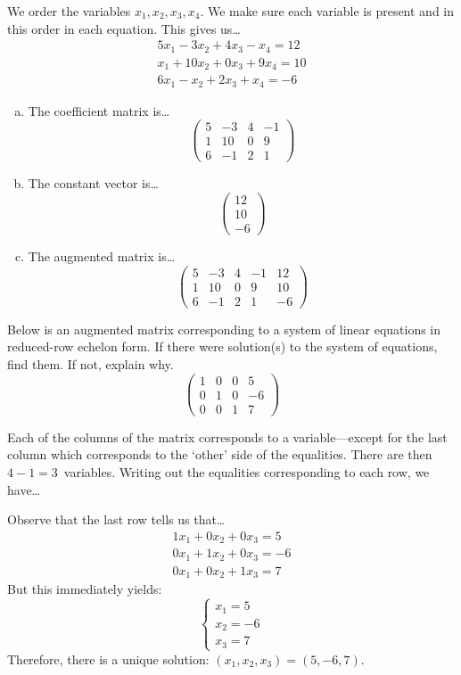 \documentclass[12pt,letterpaper]{exam}
\begin{document}
\begin{questions}
\sol We order the variables $x_1, x_2, x_3, x_4$. We make sure each variable is present and in this order in each equation. This gives us\dots
	\[
	\begin{aligned}
	5x_1 - 3x_2 + 4x_3 - x_4= 12 \\
	x_1 + 10x_2 + 0x_3 + 9x_4= 10 \\
	6x_1 - x_2 + 2x_3 + x_4= -6
	\end{aligned}
	\]

\begin{enumerate}[(a)]
\item The coefficient matrix is\dots
	\[
	\begin{pmatrix}
	5 & -3 & 4 & -1 \\
	1 & 10 & 0 & 9 \\
	6 & -1 & 2 & 1
	\end{pmatrix}
	\] \pspace

\item The constant vector is\dots
	\[
	\begin{pmatrix} 12 \\ 10 \\ -6 \end{pmatrix}
	\] \pspace

\item The augmented matrix is\dots
	\[
	\begin{pmatrix}
	5 & -3 & 4 & -1 & 12 \\
	1 & 10 & 0 & 9 & 10 \\
	6 & -1 & 2 & 1 & -6
	\end{pmatrix}
	\]
\end{enumerate}



\newpage
\question[10] Below is an augmented matrix corresponding to a system of linear equations in reduced-row echelon form. If there were solution(s) to the system of equations, find them. If not, explain why. 
	\[
	\begin{pmatrix}
	1 & 0 & 0 & 5 \\
	0 & 1 & 0 & -6 \\
	0 & 0 & 1 & 7
	\end{pmatrix}	
	\] \pspace

\sol Each of the columns of the matrix corresponds to a variable---except for the last column which corresponds to the `other' side of the equalities. There are then $4 - 1= 3$~variables. Writing out the equalities corresponding to each row, we have\dots

Observe that the last row tells us that\dots
	\[
	\begin{gathered}
	1x_1 + 0x_2 + 0x_3= 5 \\
	0x_1 + 1x_2 + 0x_3= -6 \\
	0x_1 + 0x_2 + 1x_3= 7
	\end{gathered}
	\]
But this immediately yields:
	\[
	\begin{cases}
	x_1= 5 \\
	x_2= -6 \\
	x_3= 7
	\end{cases}
	\]
Therefore, there is a unique solution: $(x_1, x_2, x_3)= (5, -6, 7)$.  




\end{questions}
\end{document}
